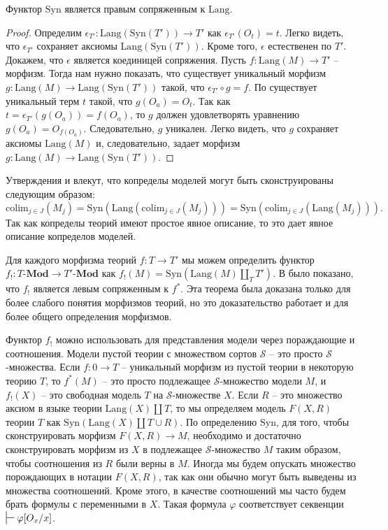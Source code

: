 \documentclass[reqno]{amsart}
\theoremstyle{definition}
\theoremstyle{remark}
\newcommand{\bcat}[1]{\mathbf{#1}}
\newcommand{\Mod}[1]{#1\text{-}\bcat{Mod}}
\newcommand{\fs}[1]{\mathrm{#1}}
\newcommand{\Lang}{\fs{Lang}}
\newcommand{\Syn}{\fs{Syn}}
\newcommand{\colim}{\fs{colim}}
\begin{document}
\begin{prop}
Функтор $\Syn$ является правым сопряженным к $\Lang$.
\end{prop}
\begin{proof}
Определим $\epsilon_{T'} : \Lang(\Syn(T')) \to T'$ как $\epsilon_{T'}(O_t) = t$.
Легко видеть, что $\epsilon_{T'}$ сохраняет аксиомы $\Lang(\Syn(T'))$.
Кроме того, $\epsilon$ естественен по $T'$.
Докажем, что $\epsilon$ является коединицей сопряжения.
Пусть $f : \Lang(M) \to T'$ -- морфизм.
Тогда нам нужно показать, что существует уникальный морфизм $g : \Lang(M) \to \Lang(\Syn(T'))$ такой, что $\epsilon_{T'} \circ g = f$.
По  существует уникальный терм $t$ такой, что $g(O_a) = O_t$.
Так как $t = \epsilon_{T'}(g(O_a)) = f(O_a)$, то $g$ должен удовлетворять уравнению $g(O_a) = O_{f(O_a)}$.
Следовательно, $g$ уникален.
Легко видеть, что $g$ сохраняет аксиомы $\Lang(M)$ и, следовательно, задает морфизм $g : \Lang(M) \to \Lang(\Syn(T'))$.
\end{proof}

\begin{remark}
Утверждения  и  влекут, что копределы моделей могут быть сконструированы следующим образом:
\[ \colim_{j \in J}(M_j) = \Syn(\Lang(\colim_{j \in J}(M_j))) = \Syn(\colim_{j \in J}(\Lang(M_j))). \]
Так как копределы теорий имеют простое явное описание, то это дает явное описание копределов моделей.
\end{remark}

Для каждого морфизма теорий $f : T \to T'$ мы можем определить функтор $f_! : \Mod{T} \to \Mod{T'}$ как $f_!(M) = \Syn(\Lang(M) \amalg_{T} T')$.
В \cite[Theorem~29]{PHL} было показано, что $f_!$ является левым сопряженным к $f^*$.
Эта теорема была доказана только для более слабого понятия морфизмов теорий, но это доказательство работает и для более общего определения морфизмов.

Функтор $f_!$ можно использовать для представления модели через пораждающие и соотношения.
Модели пустой теории с множеством сортов $\mathcal{S}$ -- это просто $\mathcal{S}$-множества.
Если $f : 0 \to T$ -- уникальный морфизм из пустой теории в некоторую теорию $T$, то $f^*(M)$ -- это просто подлежащее $\mathcal{S}$-множество модели $M$, и $f_!(X)$ -- это свободная модель $T$ на $\mathcal{S}$-множестве $X$.
Если $R$ -- это множество аксиом в языке теории $\Lang(X) \amalg T$, то мы определяем модель $F(X,R)$ теории $T$ как $\Syn(\Lang(X) \amalg T \cup R)$.
По определению $\Syn$, для того, чтобы сконструировать морфизм $F(X,R) \to M$, необходимо и достаточно сконструировать морфизм из $X$ в подлежащее $\mathcal{S}$-множество $M$ таким образом, чтобы соотношения из $R$ были верны в $M$.
Иногда мы будем опускать множество порождающих в нотации $F(X,R)$, так как они обычно могут быть выведены из множества соотношений.
Кроме этого, в качестве соотношений мы часто будем брать формулы с переменными в $X$.
Такая формула $\varphi$ соответствует секвенции $\sststile{}{} \varphi[O_x/x]$.
\end{document}

